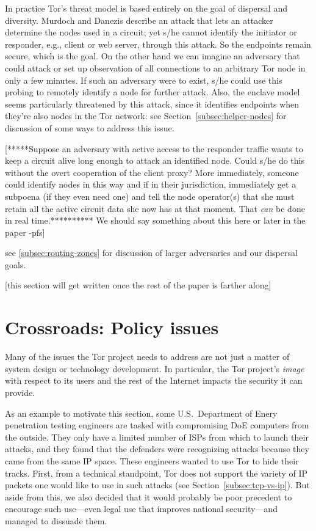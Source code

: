 \documentclass{llncs}
\begin{document}
In practice Tor's threat model is based entirely on the goal of
dispersal and diversity. Murdoch and Danezis describe an attack
\cite{attack-tor-oak05} that lets an attacker determine the nodes used
in a circuit; yet s/he cannot identify the initiator or responder,
e.g., client or web server, through this attack. So the endpoints
remain secure, which is the goal. On the other hand we can imagine an
adversary that could attack or set up observation of all connections
to an arbitrary Tor node in only a few minutes.  If such an adversary
were to exist, s/he could use this probing to remotely identify a node
for further attack.  Also, the enclave model seems particularly
threatened by this attack, since it identifies endpoints when they're
also nodes in the Tor network: see Section~\ref{subsec:helper-nodes}
for discussion of some ways to address this issue.

[*****Suppose an adversary with active access to the responder traffic
wants to keep a circuit alive long enough to attack an identified
node. Could s/he do this without the overt cooperation of the client
proxy? More immediately, someone could identify nodes in this way and
if in their jurisdiction, immediately get a subpoena (if they even
need one) and tell the node operator(s) that she must retain all the
active circuit data she now has at that moment.  That \emph{can} be
done in real time.********** We should say something about this
here or later in the paper -pfs]

see \ref{subsec:routing-zones} for discussion of larger
adversaries and our dispersal goals.

[this section will get written once the rest of the paper is farther along]

\section{Crossroads: Policy issues}
\label{sec:crossroads-policy}

Many of the issues the Tor project needs to address are not just a
matter of system design or technology development. In particular, the
Tor project's \emph{image} with respect to its users and the rest of
the Internet impacts the security it can provide.

As an example to motivate this section, some U.S.~Department of Enery
penetration testing engineers are tasked with compromising DoE computers
from the outside. They only have a limited number of ISPs from which to
launch their attacks, and they found that the defenders were recognizing
attacks because they came from the same IP space. These engineers wanted
to use Tor to hide their tracks. First, from a technical standpoint,
Tor does not support the variety of IP packets one would like to use in
such attacks (see Section~\ref{subsec:tcp-vs-ip}). But aside from this,
we also decided that it would probably be poor precedent to encourage
such use---even legal use that improves national security---and managed
to dissuade them.
\end{document}
